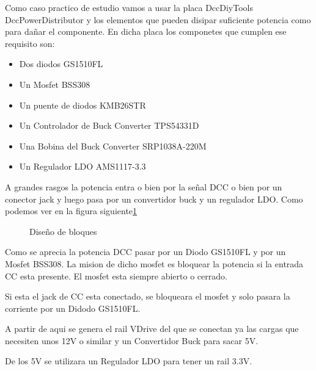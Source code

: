 
Como caso practico de estudio vamos a usar la placa DccDiyTools DccPowerDistributor y los elementos que
pueden disipar suficiente potencia como para dañar el componente. En dicha placa los
componetes que cumplen ese requisito son:
\begin{itemize}
    \item Dos diodos GS1510FL
    \item Un Mosfet BSS308
    \item Un puente de diodos KMB26STR
    \item Un Controlador de Buck Converter TPS54331D
    \item Una Bobina del Buck Converter SRP1038A-220M
    \item Un Regulador LDO AMS1117-3.3
\end{itemize}
A grandes rasgos la potencia entra o bien por la señal DCC o bien por un conector jack y luego pasa por un convertidor buck y un regulador LDO. Como podemos ver en la figura siguiente\ref{fig:Bloques}
\begin{figure}[H]
    \centering
    
    \caption{Diseño de bloques}
    \label{fig:Bloques}
\end{figure}

Como se aprecia la potencia DCC pasar por un Diodo GS1510FL y por un Mosfet BSS308. La mision de dicho mosfet es bloquear la potencia si la entrada CC esta presente. El mosfet esta siempre abierto o cerrado.

Si esta el jack de CC esta conectado, se bloqueara el mosfet y solo pasara la corriente por un Didodo GS1510FL.

A partir de aqui se genera el rail VDrive del que se conectan ya las cargas que necesiten unos 12V o similar y un Convertidor Buck para sacar 5V.

De los 5V se utilizara un Regulador LDO para tener un rail 3.3V.

